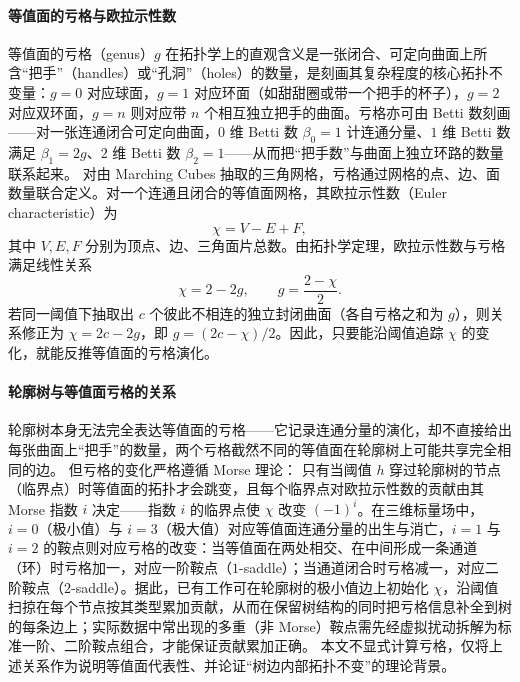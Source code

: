 \documentclass[twocolumn, a4paper, 10pt]{article}
\begin{document}
\paragraph{等值面的亏格与欧拉示性数}等值面的亏格（genus）$g$ 在拓扑学上的直观含义是一张闭合、可定向曲面上所含“把手”（handles）或“孔洞”（holes）的数量，是刻画其复杂程度的核心拓扑不变量：$g=0$ 对应球面，$g=1$ 对应环面（如甜甜圈或带一个把手的杯子），$g=2$ 对应双环面，$g=n$ 则对应带 $n$ 个相互独立把手的曲面。亏格亦可由 Betti 数刻画——对一张连通闭合可定向曲面，$0$ 维 Betti 数 $\beta_0=1$ 计连通分量、$1$ 维 Betti 数满足 $\beta_1=2g$、$2$ 维 Betti 数 $\beta_2=1$——从而把“把手数”与曲面上独立环路的数量联系起来。\cite{edelsbrunner_harer_2010} 对由 Marching Cubes 抽取的三角网格，亏格通过网格的点、边、面数量联合定义。对一个连通且闭合的等值面网格，其欧拉示性数（Euler characteristic）为
\begin{equation}
\chi = V - E + F,
\label{eq:euler}
\end{equation}
其中 $V,E,F$ 分别为顶点、边、三角面片总数。由拓扑学定理，欧拉示性数与亏格满足线性关系
\begin{equation}
\chi = 2 - 2g,\qquad g = \frac{2-\chi}{2}.
\label{eq:genus}
\end{equation}
若同一阈值下抽取出 $c$ 个彼此不相连的独立封闭曲面（各自亏格之和为 $g$），则关系修正为 $\chi=2c-2g$，即 $g=(2c-\chi)/2$。因此，只要能沿阈值追踪 $\chi$ 的变化，就能反推等值面的亏格演化。

\paragraph{轮廓树与等值面亏格的关系}轮廓树本身无法完全表达等值面的亏格——它记录连通分量的演化，却不直接给出每张曲面上“把手”的数量，两个亏格截然不同的等值面在轮廓树上可能共享完全相同的边。\cite{carr_flexible_2010} 但亏格的变化严格遵循 Morse 理论：\cite{milnor_morse_1963,edelsbrunner_harer_2010} 只有当阈值 $h$ 穿过轮廓树的节点（临界点）时等值面的拓扑才会跳变，且每个临界点对欧拉示性数的贡献由其 Morse 指数 $i$ 决定——指数 $i$ 的临界点使 $\chi$ 改变 $(-1)^i$。在三维标量场中，$i=0$（极小值）与 $i=3$（极大值）对应等值面连通分量的出生与消亡，$i=1$ 与 $i=2$ 的鞍点则对应亏格的改变：当等值面在两处相交、在中间形成一条通道（环）时亏格加一，对应一阶鞍点（$1$-saddle）；当通道闭合时亏格减一，对应二阶鞍点（$2$-saddle）。据此，已有工作可在轮廓树的极小值边上初始化 $\chi$，沿阈值扫掠在每个节点按其类型累加贡献，从而在保留树结构的同时把亏格信息补全到树的每条边上；实际数据中常出现的多重（非 Morse）鞍点需先经虚拟扰动拆解为标准一阶、二阶鞍点组合，才能保证贡献累加正确。\cite{van_kreveld_1997,carr_contour_2003,ni_fair_2004} 本文不显式计算亏格，仅将上述关系作为说明等值面代表性、并论证“树边内部拓扑不变”的理论背景。
\end{document}
